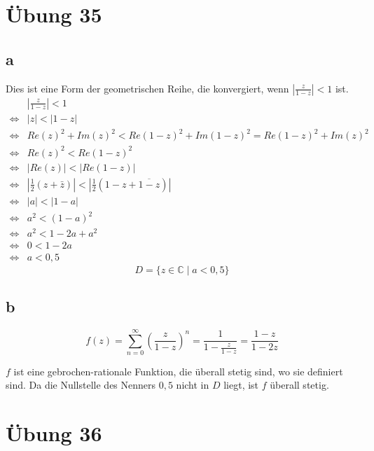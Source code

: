\documentclass[a4paper,10pt]{article}
\begin{document}
\section*{Übung 35}

\subsection*{a}

Dies ist eine Form der geometrischen Reihe, die konvergiert, wenn $\left|\frac{z}{1 - z}\right| < 1$ ist.
\begin{align}
 & \left|\frac{z}{1 - z}\right| < 1\\
 \Leftrightarrow & |z| < |1 - z|\\
 \Leftrightarrow & Re(z)^2 + Im(z)^2 < Re(1 - z)^2 + Im(1 - z)^2 = Re(1 - z)^2 + Im(z)^2\\
 \Leftrightarrow & Re(z)^2 < Re(1 - z)^2\\
 \Leftrightarrow & |Re(z)| < |Re(1 - z)|\\
 \Leftrightarrow & |\frac{1}{2}(z + \bar{z})| < |\frac{1}{2}(1 - z + \overline{1 - z})|\\
 \Leftrightarrow & |a| < |1 - a|\\
 \Leftrightarrow & a^2 < (1 - a)^2\\
 \Leftrightarrow & a^2 < 1 - 2a + a^2\\
 \Leftrightarrow & 0 < 1 - 2a\\
 \Leftrightarrow & a < 0,5
\end{align}
\begin{equation}
 D = \{z \in \mathbb{C} \mid a < 0,5\}
\end{equation}

\subsection*{b}

\begin{equation}
 f(z) = \sum_{n = 0}^\infty \left(\frac{z}{1 - z}\right)^n = \frac{1}{1 - \frac{z}{1 - z}} = \frac{1 - z}{1 - 2z}
\end{equation}

$f$ ist eine gebrochen-rationale Funktion, die überall stetig sind, wo sie definiert sind.
Da die Nullstelle des Nenners $0,5$ nicht in $D$ liegt, ist $f$ überall stetig.

\section*{Übung 36}
\end{document}
